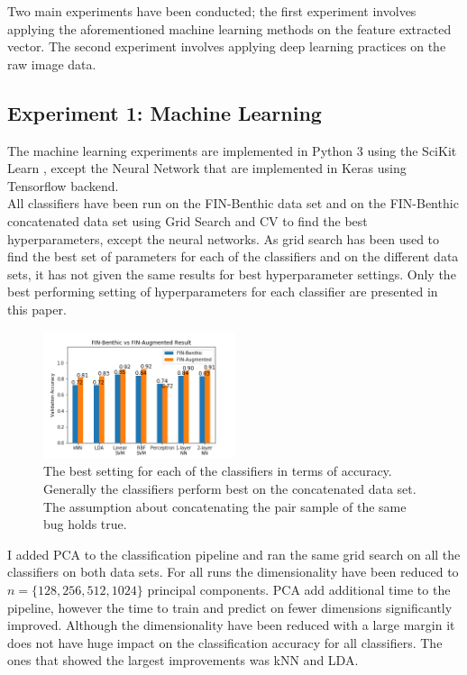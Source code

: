Two main experiments have been conducted; the first experiment involves applying the aforementioned machine learning methods on the feature extracted vector. The second experiment involves applying deep learning practices on the raw image data. 

\subsection*{Experiment 1: Machine Learning}
The machine learning experiments are implemented in Python 3 using the SciKit Learn \cite{scikit-learn}, except the Neural Network that are implemented in Keras \cite{chollet2015keras} using Tensorflow \cite{tensorflow2015-whitepaper} backend. \\

All classifiers have been run on the FIN-Benthic data set and on the FIN-Benthic concatenated data set using Grid Search and CV to find the best hyperparameters, except the neural networks. As grid search has been used to find the best set of parameters for each of the classifiers and on the different data sets, it has not given the same results for best hyperparameter settings. Only the best performing setting of hyperparameters for each classifier are presented in this paper.

\begin{figure}[H]
    \centering
    \includegraphics[width=0.5\textwidth]{figures/fin-benthic-same.png}
    \ContinuedFloat
    \caption[]{The best setting for each of the classifiers in terms of accuracy. Generally the classifiers perform best on the concatenated data set. The assumption about concatenating the pair sample of the same bug holds true.}
    \label{fig:fin_ben_concat}
\end{figure}

I added PCA to the classification pipeline and ran the same grid search on all the classifiers on both data sets. For all runs the dimensionality have been reduced to $n=\{128, 256, 512, 1024\}$ principal components. PCA add additional time to the pipeline, however the time to train and predict on fewer dimensions significantly improved. Although the dimensionality have been reduced with a large margin it does not have huge impact on the classification accuracy for all classifiers.
The ones that showed the largest improvements was kNN and LDA.

